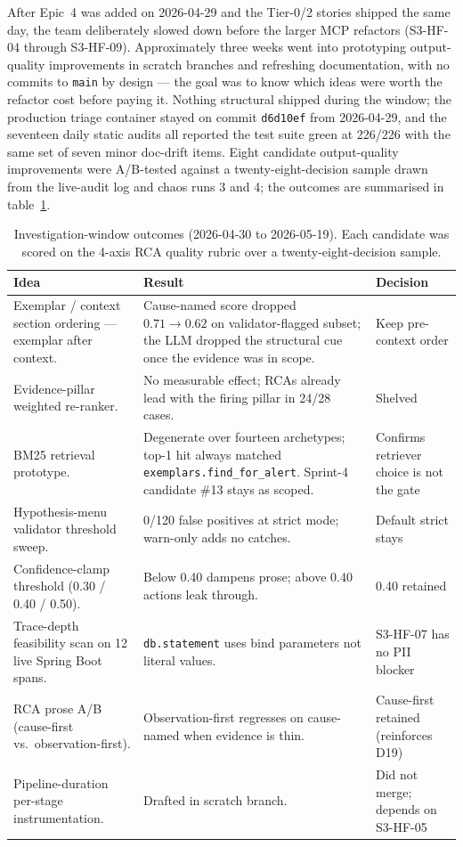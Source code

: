 \documentclass[11pt,a4paper,oneside]{report}
\begin{document}
After Epic~4 was added on 2026-04-29 and the Tier-0/2 stories shipped
the same day, the team deliberately slowed down before the larger MCP
refactors (S3-HF-04 through S3-HF-09).  Approximately three weeks
went into prototyping output-quality improvements in scratch branches
and refreshing documentation, with no commits to \texttt{main} by
design --- the goal was to know which ideas were worth the refactor
cost before paying it.  Nothing structural shipped during the window;
the production triage container stayed on commit \texttt{d6d10ef} from
2026-04-29, and the seventeen daily static audits all reported the
test suite green at 226/226 with the same set of seven minor
doc-drift items.  Eight candidate output-quality improvements were
A/B-tested against a twenty-eight-decision sample drawn from the
live-audit log and chaos runs 3 and 4; the outcomes are summarised in
table~\ref{tab:investigation}.

\begin{table}[h]
\centering
\footnotesize
\begin{tabular}{p{} p{} p{}}
\toprule
\textbf{Idea} & \textbf{Result} & \textbf{Decision} \\
\midrule
Exemplar / context section ordering --- exemplar after context. &
Cause-named score dropped $0.71 \to 0.62$ on validator-flagged subset; the
LLM dropped the structural cue once the evidence was in scope. &
Keep pre-context order \\
\midrule
Evidence-pillar weighted re-ranker. & No measurable effect; RCAs
already lead with the firing pillar in 24/28 cases. & Shelved \\
\midrule
BM25 retrieval prototype. & Degenerate over fourteen archetypes;
top-1 hit always matched
\texttt{exemplars.find\_for\_alert}.  Sprint-4 candidate \#13 stays
as scoped. & Confirms retriever choice is not the gate \\
\midrule
Hypothesis-menu validator threshold sweep. & 0/120 false positives at
strict mode; warn-only adds no catches. & Default strict stays \\
\midrule
Confidence-clamp threshold (0.30 / 0.40 / 0.50). & Below 0.40 dampens
prose; above 0.40 actions leak through.  & 0.40 retained \\
\midrule
Trace-depth feasibility scan on 12 live Spring Boot spans. &
\texttt{db.statement} uses bind parameters not literal values. &
S3-HF-07 has no PII blocker \\
\midrule
RCA prose A/B (cause-first vs.\ observation-first). & Observation-first
regresses on cause-named when evidence is thin. & Cause-first retained
(reinforces D19) \\
\midrule
Pipeline-duration per-stage instrumentation. & Drafted in scratch
branch. & Did not merge; depends on S3-HF-05 \\
\bottomrule
\end{tabular}
\caption{Investigation-window outcomes (2026-04-30 to 2026-05-19).
Each candidate was scored on the 4-axis RCA quality rubric over a
twenty-eight-decision sample.}
\label{tab:investigation}
\end{table}
\end{document}
